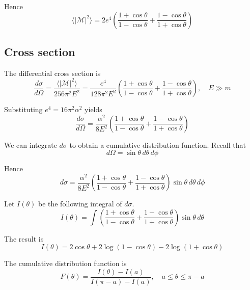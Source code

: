 \documentclass[12pt]{article}
\begin{document}
\noindent
Hence
\begin{equation*}
\langle|\mathcal{M}|^2\rangle
=2e^4\left(
\frac{1+\cos\theta}{1-\cos\theta}+
\frac{1-\cos\theta}{1+\cos\theta}
\right)
\end{equation*}

\subsection*{Cross section}
The differential cross section is
\begin{equation*}
\frac{d\sigma}{d\Omega}=\frac{\langle|\mathcal{M}|^2\rangle}{256\pi^2E^2}
=
\frac{e^4}{128\pi^2E^2}
\left(
\frac{1+\cos\theta}{1-\cos\theta}+
\frac{1-\cos\theta}{1+\cos\theta}
\right),
\quad
E\gg m
\end{equation*}

\noindent
Substituting $e^4=16\pi^2\alpha^2$ yields
\begin{equation*}
\frac{d\sigma}{d\Omega}
=
\frac{\alpha^2}{8E^2}
\left(
\frac{1+\cos\theta}{1-\cos\theta}+
\frac{1-\cos\theta}{1+\cos\theta}
\right)
\end{equation*}

\noindent
We can integrate $d\sigma$ to obtain a cumulative distribution function.
Recall that
\begin{equation*}
d\Omega=\sin\theta\,d\theta\,d\phi
\end{equation*}

\noindent
Hence
\begin{equation*}
d\sigma=
\frac{\alpha^2}{8E^2}
\left(
\frac{1+\cos\theta}{1-\cos\theta}+
\frac{1-\cos\theta}{1+\cos\theta}
\right)\sin\theta\,d\theta\,d\phi
\end{equation*}

\noindent
Let $I(\theta)$ be the following integral of $d\sigma$.
\begin{equation*}
I(\theta)
=\int
\left(
\frac{1+\cos\theta}{1-\cos\theta}+
\frac{1-\cos\theta}{1+\cos\theta}
\right)
\sin\theta\,d\theta
\end{equation*}

The result is
\begin{equation*}
I(\theta)=2\cos\theta+2\log(1-\cos\theta)-2\log(1+\cos\theta)
\end{equation*}

\noindent
The cumulative distribution function is
\begin{equation*}
F(\theta)=\frac{I(\theta)-I(a)}{I(\pi-a)-I(a)},
\quad
a\le\theta\le\pi-a
\end{equation*}
\end{document}
